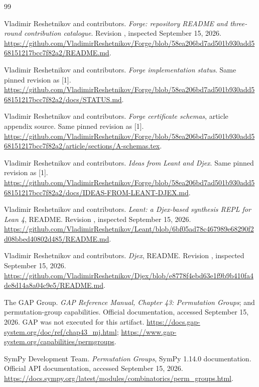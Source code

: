 \clearpage
\begin{thebibliography}{99}
\raggedright
{}
Vladimir Reshetnikov and contributors.
\emph{Forge: repository README and three-round contribution catalogue}.
Revision , inspected September 15, 2026.
\url{https://github.com/VladimirReshetnikov/Forge/blob/58ea206bd7ad501b930add568151217bcc7f82a2/README.md}.

Vladimir Reshetnikov and contributors.
\emph{Forge implementation status}.
Same pinned revision as [1].
\url{https://github.com/VladimirReshetnikov/Forge/blob/58ea206bd7ad501b930add568151217bcc7f82a2/docs/STATUS.md}.

Vladimir Reshetnikov and contributors.
\emph{Forge certificate schemas}, article appendix source.
Same pinned revision as [1].
\url{https://github.com/VladimirReshetnikov/Forge/blob/58ea206bd7ad501b930add568151217bcc7f82a2/article/sections/A-schemas.tex}.

Vladimir Reshetnikov and contributors.
\emph{Ideas from Leant and Djex}.
Same pinned revision as [1].
\url{https://github.com/VladimirReshetnikov/Forge/blob/58ea206bd7ad501b930add568151217bcc7f82a2/docs/IDEAS-FROM-LEANT-DJEX.md}.

Vladimir Reshetnikov and contributors.
\emph{Leant: a Djex-based synthesis REPL for Lean 4}, README.
Revision , inspected September 15, 2026.
\url{https://github.com/VladimirReshetnikov/Leant/blob/6bf05ad78c467989e68290f2d08bbed40802d485/README.md}.

Vladimir Reshetnikov and contributors.
\emph{Djex}, README.
Revision , inspected September 15, 2026.
\url{https://github.com/VladimirReshetnikov/Djex/blob/e8778f4ebd63e1f9b9b410fa4de8d14a8a04c9e5/README.md}.

The GAP Group.
\emph{GAP Reference Manual, Chapter 43: Permutation Groups}; and permutation-group capabilities.
Official documentation, accessed September 15, 2026. GAP was not executed for this artifact.
\url{https://docs.gap-system.org/doc/ref/chap43_mj.html};
\url{https://www.gap-system.org/capabilities/permgroups}.

SymPy Development Team.
\emph{Permutation Groups}, SymPy 1.14.0 documentation.
Official API documentation, accessed September 15, 2026.
\url{https://docs.sympy.org/latest/modules/combinatorics/perm_groups.html}.


\end{thebibliography}
